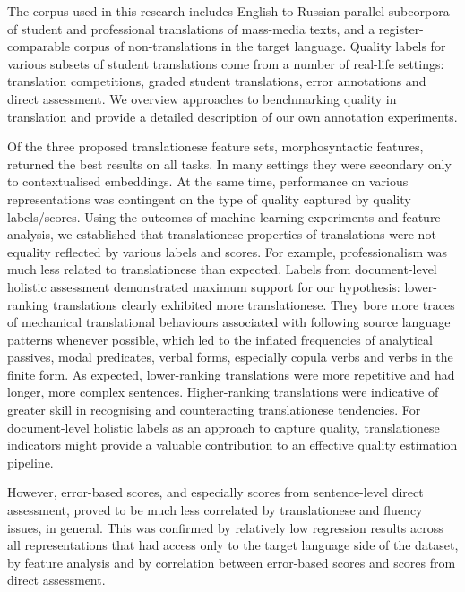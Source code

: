 The corpus used in this research includes English-to-Russian parallel subcorpora of student and professional translations of mass-media texts, and a register-comparable corpus of non-translations in the target language. Quality labels for various subsets of student translations come from a number of real-life settings: translation competitions, graded student translations, error annotations and direct assessment. We overview approaches to benchmarking quality in translation and provide a detailed description of our own annotation experiments. 

Of the three proposed translationese feature sets, morphosyntactic features, returned the best results on all tasks. In many settings they were secondary only to contextualised embeddings. At the same time, performance on various representations was contingent on the type of quality captured by quality labels/scores.
Using the outcomes of machine learning experiments and feature analysis, we established that translationese properties of translations were not equality reflected by various labels and scores. For example, professionalism was much less related to translationese than expected. 
Labels from document-level holistic assessment demonstrated maximum support for our hypothesis: lower-ranking translations clearly exhibited more translationese. They bore more traces of mechanical translational behaviours associated with following source language patterns whenever possible, which led to the inflated frequencies of analytical passives, modal predicates, verbal forms, especially copula verbs and verbs in the finite form. As expected, lower-ranking translations were more repetitive and had longer, more complex sentences. Higher-ranking translations were indicative of greater skill in recognising and counteracting translationese tendencies. For document-level holistic labels as an approach to capture quality, translationese indicators might provide a valuable contribution to an effective quality estimation pipeline. 

However, error-based scores, and especially scores from sentence-level direct assessment, proved to be much less correlated by translationese and fluency issues, in general. This was confirmed by relatively low regression results across all representations that had access only to the target language side of the dataset, by feature analysis and by correlation between error-based scores and scores from direct assessment.

